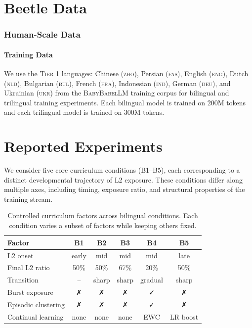 \section{Beetle Data}\label{sec:beetle-data}

\subsubsection{Human-Scale Data}
\paragraph{Training Data}  We use the \textsc{Tier 1} languages: Chinese (\textsc{zho}), Persian (\textsc{fas}), English (\textsc{eng}), Dutch (\textsc{nld}), Bulgarian (\textsc{bul}), French (\textsc{fra}), Indonesian (\textsc{ind}), German (\textsc{deu}), and Ukrainian (\textsc{ukr}) from  the \textsc{BabyBabelLM} training corpus \citep{jumelet2025babybabellmmultilingualbenchmarkdevelopmentally} for bilingual and trilingual training experiments. Each bilingual model is trained on 200M tokens and each trilingual model is trained on 300M tokens. 



\newpage


\section{Reported Experiments}\label{sec:beetle-experiments}

We consider five core curriculum conditions (B1--B5),
each corresponding to a distinct developmental trajectory
of L2 exposure. These conditions differ along multiple axes,
including timing, exposure ratio, and structural properties
of the training stream.

\begin{table}[t]
\centering
\begin{tabular}{lccccc}
\hline
\textbf{Factor} & \textbf{B1} & \textbf{B2} & \textbf{B3} & \textbf{B4} & \textbf{B5} \\
\hline
L2 onset & early & mid & mid & mid & late \\
Final L2 ratio & 50\% & 50\% & 67\% & 20\% & 50\% \\
Transition & -- & sharp & sharp & gradual & sharp \\
Burst exposure & ✗ & ✗ & ✗ & ✓ & ✗ \\
Episodic clustering & ✗ & ✗ & ✗ & ✓ & ✗ \\
Continual learning & none & none & none & EWC & LR boost \\
\hline
\end{tabular}
\caption{Controlled curriculum factors across bilingual conditions.
Each condition varies a subset of factors while keeping others fixed.}
\label{tab:taxonomy}
\end{table}

